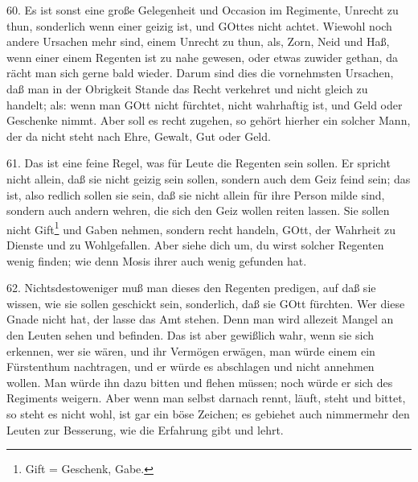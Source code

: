 60. Es ist sonst eine große Gelegenheit und Occasion im Regimente, Unrecht zu thun, sonderlich wenn einer geizig ist, und GOttes nicht achtet. Wiewohl noch andere Ursachen mehr sind, einem Unrecht zu thun, als, Zorn, Neid und Haß, wenn einer einem Regenten ist zu nahe gewesen, oder etwas zuwider gethan, da rächt man sich gerne bald wieder. Darum sind dies die vornehmsten Ursachen, daß man in der Obrigkeit Stande das Recht verkehret und nicht gleich zu handelt; als: wenn man GOtt nicht fürchtet, nicht wahrhaftig ist, und Geld oder Geschenke nimmt. Aber soll es recht zugehen, so gehört hierher ein solcher Mann, der da nicht steht nach Ehre, Gewalt, Gut oder Geld.

61. Das ist eine feine Regel, was für Leute die Regenten sein sollen. Er spricht nicht allein, daß sie nicht geizig sein sollen, sondern auch dem Geiz feind sein; das ist, also redlich sollen sie sein, daß sie nicht allein für ihre Person milde sind, sondern auch andern wehren, die sich den Geiz wollen reiten lassen. Sie sollen nicht Gift\footnote{Gift = Geschenk, Gabe.} und Gaben nehmen, sondern recht handeln, GOtt, der Wahrheit zu Dienste und zu Wohlgefallen. Aber siehe dich um, du wirst solcher Regenten wenig finden; wie denn Mosis ihrer auch wenig gefunden hat.

62. Nichtsdestoweniger muß man dieses den Regenten predigen, auf daß sie wissen, wie sie sollen geschickt sein, sonderlich, daß sie GOtt fürchten. Wer diese Gnade nicht hat, der lasse das Amt stehen. Denn man wird allezeit Mangel an den Leuten sehen und befinden. Das ist aber gewißlich wahr, wenn sie sich erkennen, wer sie wären, und ihr Vermögen erwägen, man würde einem ein Fürstenthum nachtragen, und er würde es abschlagen und nicht annehmen wollen. Man würde ihn dazu bitten und flehen müssen; noch würde er sich des Regiments weigern. Aber wenn man selbst darnach rennt, läuft, steht und bittet, so steht es nicht wohl, ist gar ein böse Zeichen; es gebiehet auch nimmermehr den Leuten zur Besserung, wie die Erfahrung gibt und lehrt.
